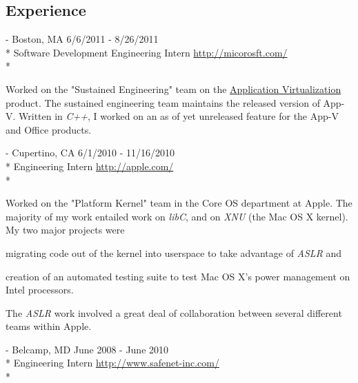 \documentclass[a4paper,margin,line]{resume}
\newcommand{\rurl}[1]{\hfill {\footnotesize \url{#1}}}
\newcommand{\rdate}[1]{\hfill {\small #1}}
\renewcommand{\employer}[5]{\item[#1] - #2 \rdate{#3} \\* #4 \rurl{#5} \\*}
\begin{document}
\begin{resume}
\section{\mysidestyle Experience}
	\begin{asparadesc}
		\employer{Microsoft}{Boston, MA}{6/6/2011 - 8/26/2011}{Software Development Engineering Intern}{http://micorosft.com/}

		\small
		Worked on the "Sustained Engineering" team on the \href{http://www.microsoft.com/windows/enterprise/solutions/virtualization/products/app-v.aspx}{Application Virtualization} product. The sustained engineering team maintains the released version of App-V. Written in \emph{C++}, I worked on an as of yet unreleased feature for the App-V and Office products.
		\normalsize
		\\
		\employer{Apple Inc}{Cupertino, CA}{6/1/2010 - 11/16/2010}{Engineering Intern}{http://apple.com/}

		\small
		Worked on the "Platform Kernel" team in the Core OS department at Apple. The majority of my work entailed work on \emph{libC}, and on \emph{XNU} (the Mac OS X kernel). My two major projects were \begin{inparaenum} \item migrating code out of the kernel into userspace to take advantage of \emph{ASLR} and \item creation of an automated testing suite to test Mac OS X's power management on Intel processors. \end{inparaenum} The \emph{ASLR} work involved a great deal of collaboration between several different teams within Apple.
		\normalsize
		\\
%
		\employer{SafeNet Inc}{Belcamp, MD}{June 2008 - June 2010}{Engineering Intern}{http://www.safenet-inc.com/}


\end{asparadesc}
\end{resume}
\end{document}
